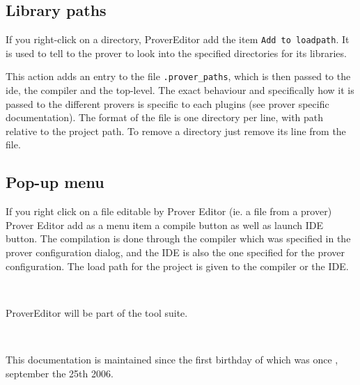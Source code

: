 \documentclass[a4paper]{article}
\newcommand{\proverspec}{ prover specific documentation}
\begin{document}
\subsection{Library paths}
If you right-click on a directory, ProverEditor add the item 
{\tt Add to loadpath}. It is used to tell to the prover to look into
the specified directories for its libraries.


This action adds an entry to the file {\tt .prover_paths}, which is then
passed to the ide, the compiler and the top-level. The exact behaviour and 
specifically how it is passed to  the different provers is specific to 
each plugins (see \proverspec).
The format of the file is one directory per line, with path relative
to the project path. To remove a directory just remove its line from 
the file.

\subsection{Pop-up menu}
If you right click on a file editable by Prover Editor (ie. a file from
a prover) Prover Editor add as a menu item a compile button as well as launch
IDE button. The compilation is done through the compiler which was specified 
in the prover configuration dialog, and the IDE is also 
the one specified for the prover configuration. The load path for the 
project is given to the compiler or the IDE.





\\ 
\begin{it}
ProverEditor will be part of the  
tool suite.\\
\end{it}

\\


\begin{it}
This documentation is maintained since the first birthday of 
 which
was once , september the 25th 2006.
\end{it}
\end{document}
